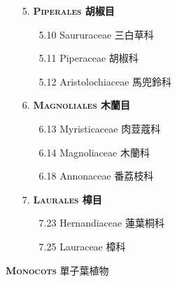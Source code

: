 \begin{enumerate}
  \item[5. ] \textbf{\textsc{Piperales} 胡椒目} 
    \begin{enumerate}
      \item[5.10] Saururaceae 三白草科  
        
      \item[5.11] Piperaceae 胡椒科  
        
      \item[5.12] Aristolochiaceae 馬兜鈴科  
        
    \end{enumerate}
  \item[6. ] \textbf{\textsc{Magnoliales} 木蘭目} 
    \begin{enumerate}
      \item[6.13] Myristicaceae 肉荳蔻科  
        
      \item[6.14] Magnoliaceae 木蘭科  
        
      \item[6.18] Annonaceae 番荔枝科  
        
    \end{enumerate}
  \item[7. ] \textbf{\textsc{Laurales} 樟目} 
    \begin{enumerate}
      \item[7.23] Hernandiaceae 蓮葉桐科  
        
      \item[7.25] Lauraceae 樟科  
        
    \end{enumerate}
\end{enumerate}
\vspace{2ex} 
\noindent \normalsize\textsc{\textbf{Monocots} 單子葉植物}\selectfont \\
\footnotesize\selectfont
